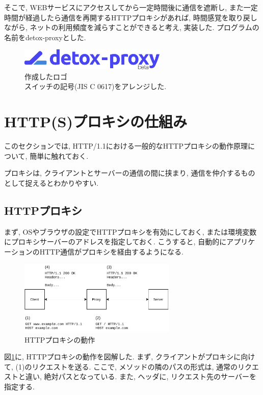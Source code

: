 \documentclass[10pt,a4paper,uplatex,a4j,dvipdfmx]{jsarticle}
\begin{document}
\begin{multicols}{2}
    そこで, WEBサービスにアクセスしてから一定時間後に通信を遮断し, また一定時間が経過したら通信を再開するHTTPプロキシがあれば, 時間感覚を取り戻しながら, ネットの利用頻度を減らすことができると考え, 実装した.
プログラムの名前をdetox-proxyとした.
    
    \begin{figure}[H]
      \center
      \includegraphics[width=7cm]{img/logo.eps}
      \caption{作成したロゴ \\ スイッチの記号(JIS C 0617)をアレンジした.}
    \end{figure}

    \section{HTTP(S)プロキシの仕組み}
    
    このセクションでは, HTTP/1.1における一般的なHTTPプロキシの動作原理について, 簡単に触れておく.

    プロキシは, クライアントとサーバーの通信の間に挟まり, 通信を仲介するものとして捉えるとわかりやすい.
    
    \subsection{HTTPプロキシ}
    \label{sec:http}
    まず, OSやブラウザの設定でHTTPプロキシを有効にしておく, または環境変数にプロキシサーバーのアドレスを指定しておく.
    こうすると, 自動的にアプリケーションのHTTP通信がプロキシを経由するようになる.
    \begin{figure}[H]
      \center
      \includegraphics[width=7.5cm]{img/proxyhttp.pdf}
      \caption{HTTPプロキシの動作 \label{img:proxy:http}}
    \end{figure}
    
    図\ref{img:proxy:http}に, HTTPプロキシの動作を図解した.
    まず, クライアントがプロキシに向けて, (1)のリクエストを送る.
    ここで, メソッドの隣のパスの形式は, 通常のリクエストと違い, 絶対パスとなっている. また, ヘッダに, リクエスト先のサーバーを指定する.
    

\end{multicols}
\end{document}
